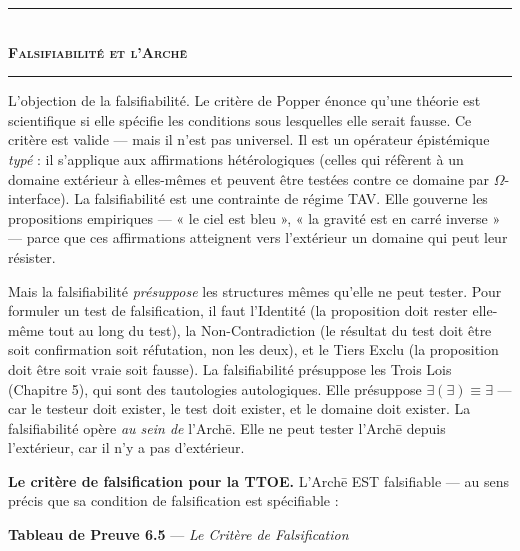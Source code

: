 \documentclass[10pt, openany, oneside]{book}
\renewcommand{\normalsize}{\fontsize{10}{13}\selectfont}
\begin{document}
\begin{center}
    \rule{0.3\textwidth}{0.4pt}\\[0.5em]
    {\normalsize\bfseries\scshape Falsifiabilité et l'Arch\={e}}\\[0.3em]
    \rule{0.3\textwidth}{0.4pt}
\end{center}

\vspace{1em}

\noindent L'objection de la falsifiabilité. Le critère de Popper énonce qu'une théorie est scientifique si elle spécifie les conditions sous lesquelles elle serait fausse. Ce critère est valide --- mais il n'est pas universel. Il est un opérateur épistémique \textit{typé} : il s'applique aux affirmations hétérologiques (celles qui réfèrent à un domaine extérieur à elles-mêmes et peuvent être testées contre ce domaine par $\Omega$-interface). La falsifiabilité est une contrainte de régime TAV. Elle gouverne les propositions empiriques --- « le ciel est bleu », « la gravité est en carré inverse » --- parce que ces affirmations atteignent vers l'extérieur un domaine qui peut leur résister.

Mais la falsifiabilité \textit{présuppose} les structures mêmes qu'elle ne peut tester. Pour formuler un test de falsification, il faut l'Identité (la proposition doit rester elle-même tout au long du test), la Non-Contradiction (le résultat du test doit être soit confirmation soit réfutation, non les deux), et le Tiers Exclu (la proposition doit être soit vraie soit fausse). La falsifiabilité présuppose les Trois Lois (Chapitre 5), qui sont des tautologies autologiques. Elle présuppose $\exists(\exists) \equiv \exists$ --- car le testeur doit exister, le test doit exister, et le domaine doit exister. La falsifiabilité opère \textit{au sein de} l'Arch\={e}. Elle ne peut tester l'Arch\={e} depuis l'extérieur, car il n'y a pas d'extérieur.

\textbf{Le critère de falsification pour la TTOE.} L'Arch\={e} EST falsifiable --- au sens précis que sa condition de falsification est spécifiable :

\vspace{0.5em}

\textbf{Tableau de Preuve 6.5} --- \textit{Le Critère de Falsification}

\vspace{0.5em}
\end{document}
